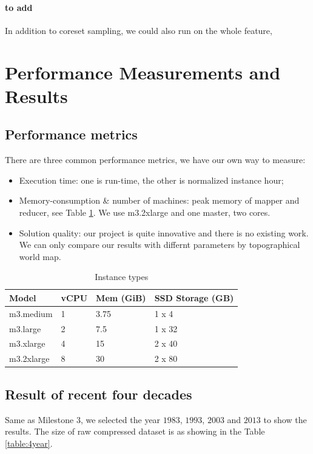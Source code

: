 \paragraph{to add}
In addition to coreset sampling, we could also run on the whole feature, 

\section{Performance Measurements and Results}

\subsection{Performance metrics}
There are three common performance metrics, we have our own way to measure:
\begin{itemize}
    \item Execution time: one is run-time, the other is normalized instance hour;
    \item Memory-consumption \& number of machines: peak memory of mapper and reducer, see Table \ref{table:m3}. We use m3.2xlarge and one master, two cores.
    \item Solution quality: our project is quite innovative and there is no existing work. We can only compare our results with differnt parameters by topographical world map\cite{world}.
\end{itemize}

\begin{table}[htbp]
    \centering
    \label{table:m3}
    \begin{tabular}{|l|l|l|l|}
        \hline
        Model & vCPU & Mem (GiB) & SSD Storage (GB) \\
        \hline
        m3.medium & 1 & 3.75 & 1 x 4  \\
        m3.large  & 2 & 7.5 & 1 x 32 \\
        m3.xlarge & 4 & 15 & 2 x 40 \\
        m3.2xlarge& 8 & 30 & 2 x 80 \\
        \hline
    \end{tabular}
    \caption{Instance types}
\end{table}

\subsection{Result of recent four decades}
Same as Milestone $3$, we selected the year $1983$, $1993$, $2003$ and $2013$ to show the results. The size of raw compressed dataset is as showing in the Table \ref{table:4year}.

